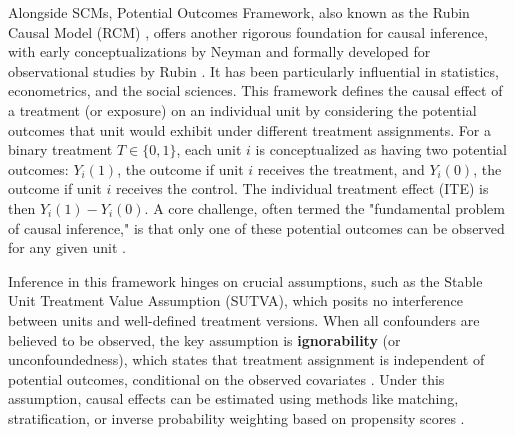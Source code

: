 {Alongside SCMs, Potential Outcomes Framework, also known as the Rubin Causal Model (RCM) \cite{holland1986statistics}, offers another rigorous foundation for causal inference, with early conceptualizations by Neyman \cite{splawa1990application} and formally developed for observational studies by Rubin \cite{rubin1974estimating}. It has been particularly influential in statistics, econometrics, and the social sciences. This framework defines the causal effect of a treatment (or exposure) on an individual unit by considering the potential outcomes that unit would exhibit under different treatment assignments. For a binary treatment $T \in \{0,1\}$, each unit $i$ is conceptualized as having two potential outcomes: $Y_i(1)$, the outcome if unit $i$ receives the treatment, and $Y_i(0)$, the outcome if unit $i$ receives the control. The individual treatment effect (ITE) is then $Y_i(1) - Y_i(0)$. A core challenge, often termed the "fundamental problem of causal inference," is that only one of these potential outcomes can be observed for any given unit \cite{holland1986statistics}.

Inference in this framework hinges on crucial assumptions, such as the Stable Unit Treatment Value Assumption (SUTVA), which posits no interference between units and well-defined treatment versions. When all confounders are believed to be observed, the key assumption is \textbf{ignorability} (or unconfoundedness), which states that treatment assignment is independent of potential outcomes, conditional on the observed covariates \cite{rosenbaum1983central}. Under this assumption, causal effects can be estimated using methods like matching, stratification, or inverse probability weighting based on propensity scores \cite{rosenbaum1983central}.

}
